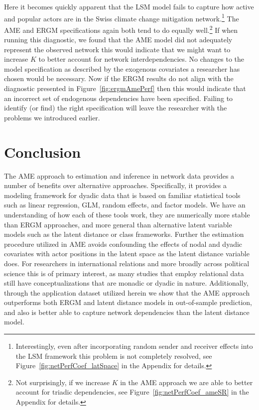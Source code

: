 \documentclass[12pt,pdflatex]{elsarticle}
\begin{document}
Here it becomes quickly apparent that the LSM model fails to capture how active and popular actors are in the Swiss climate change mitigation network.\footnote{Interestingly, even after incorporating random sender and receiver effects into the LSM framework this problem is not completely resolved, see Figure~\ref{fig:netPerfCoef_latSpace} in the Appendix for details.} The AME and ERGM specifications again both tend to do equally well.\footnote{Not surprisingly, if we increase $K$ in the AME approach we are able to better account for triadic dependencies, see Figure~\ref{fig:netPerfCoef_ameSR} in the Appendix for details.} If when running this diagnostic, we found that the AME model did not adequately represent the observed network this would indicate that we might want to increase $K$ to better account for network interdependencies. No changes to the model specification as described by the exogenous covariates a researcher has chosen would be necessary. Now if the ERGM results do not align with the diagnostic presented in Figure~\ref{fig:ergmAmePerf} then this would indicate that an incorrect set of endogenous dependencies have been specified. Failing to identify (or find) the right specification will leave the researcher with the problems we introduced earlier.

\section{\textbf{Conclusion}}

The AME approach to estimation and inference in network data provides a number of benefits over alternative approaches. Specifically, it provides a modeling framework for dyadic data that is based on familiar statistical tools such as linear regression, GLM, random effects, and factor models. We have an understanding of how each of these tools work, they are numerically more stable than ERGM approaches, and more general than alternative latent variable models such as the latent distance or class frameworks. Further the estimation procedure utilized in AME avoids confounding the effects of nodal and dyadic covariates with actor positions in the latent space as the latent distance variable does. For researchers in international relations and more broadly across political science this is of primary interest, as many studies that employ relational data still have conceptualizations  that are monadic or dyadic in nature. Additionally, through the application dataset utilized herein we show that the AME approach outperforms both ERGM and latent distance models in out-of-sample prediction, and also is better able to capture network dependencies than the latent distance model. 
\end{document}
